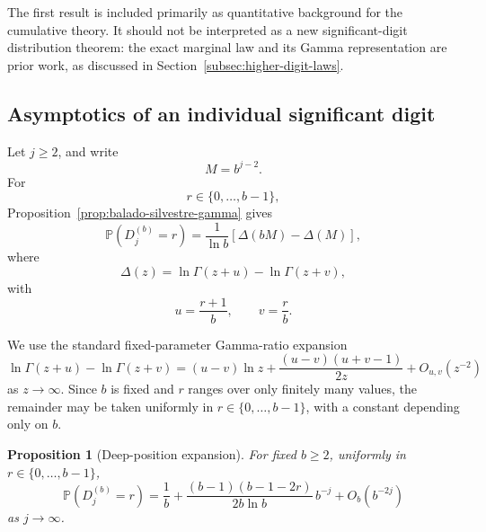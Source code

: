 \documentclass[11pt]{article}
\newtheorem{proposition}[theorem]{Proposition}
\theoremstyle{definition}
\theoremstyle{remark}
\begin{document}
The first result is included primarily as quantitative background for
the cumulative theory.  It should not be interpreted as a new
significant-digit distribution theorem: the exact marginal law and its
Gamma representation are prior work, as discussed in
Section~\ref{subsec:higher-digit-laws}.

\subsection{Asymptotics of an individual significant digit}
\label{subsec:individual-digit-asymptotics}

Let \(j\ge2\), and write
\[
    M=b^{j-2}.
\]
For
\[
    r\in\{0,\ldots,b-1\},
\]
Proposition~\ref{prop:balado-silvestre-gamma} gives
\begin{equation}
    \mathbb P(D_j^{(b)}=r)
    =
    \frac{1}{\ln b}
    \left[
        \Delta(bM)-\Delta(M)
    \right],
    \label{eq:digit-pmf-delta}
\end{equation}
where
\[
    \Delta(z)
    =
    \ln\Gamma(z+u)-\ln\Gamma(z+v),
\]
with
\[
    u=\frac{r+1}{b},
    \qquad
    v=\frac{r}{b}.
\]

We use the standard fixed-parameter Gamma-ratio expansion
\cite[\S5.11(iii)]{DLMFStirling}
\begin{equation}
    \ln\Gamma(z+u)-\ln\Gamma(z+v)
    =
    (u-v)\ln z
    +
    \frac{(u-v)(u+v-1)}{2z}
    +
    O_{u,v}(z^{-2})
    \label{eq:loggamma-ratio-first-order}
\end{equation}
as \(z\to\infty\).
Since \(b\) is fixed and \(r\) ranges over only finitely many values,
the remainder may be taken uniformly in
\(r\in\{0,\ldots,b-1\}\), with a constant depending only on \(b\).

\begin{proposition}[Deep-position expansion]
\label{prop:deep-position-expansion}
For fixed \(b\ge2\), uniformly in
\(r\in\{0,\ldots,b-1\}\),
\begin{equation}
\boxed{
    \mathbb P(D_j^{(b)}=r)
    =
    \frac1b
    +
    \frac{(b-1)(b-1-2r)}
         {2b\ln b}\,b^{-j}
    +
    O_b(b^{-2j})
}
\label{eq:deep-position-expansion}
\end{equation}
as \(j\to\infty\).
\end{proposition}
\end{document}
